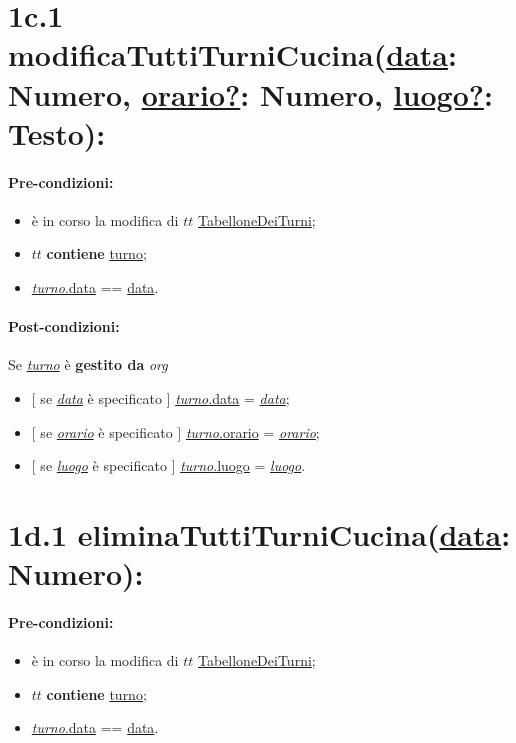 {\section*{1c.1 modificaTuttiTurniCucina(\underline{data}: Numero, \underline{orario?}: Numero, \underline{luogo?}: Testo):}

\paragraph{Pre-condizioni:}

\begin{itemize}
 \item è in corso la modifica di $tt$ \underline{TabelloneDeiTurni};
 \item $tt$ \textbf{contiene} \underline{turno};
 \item \underline{\textit{turno}.data} == \underline{data}.
\end{itemize}

\paragraph{Post-condizioni:} Se \underline{\textit{turno}} è \textbf{gestito da} {\textit{org}}

 \begin{itemize}
     \item $[$ se \underline{\textit{data}} è specificato $]$ \underline{\textit{turno}.data} = \underline{\textit{data}};

    \item $[$ se \underline{\textit{orario}} è specificato $]$ \underline{\textit{turno}.orario} = \underline{\textit{orario}};

    \item $[$ se \underline{\textit{luogo}} è specificato $]$ \underline{\textit{turno}.luogo} = \underline{\textit{luogo}}.

\end{itemize}

\section*{1d.1 eliminaTuttiTurniCucina(\underline{data}: Numero):}

\paragraph{Pre-condizioni:}
\begin{itemize}
 \item è in corso la modifica di $tt$ \underline{TabelloneDeiTurni};
 \item $tt$ \textbf{contiene} \underline{turno};
 \item \underline{\textit{turno}.data} == \underline{data}.
\end{itemize}

}
